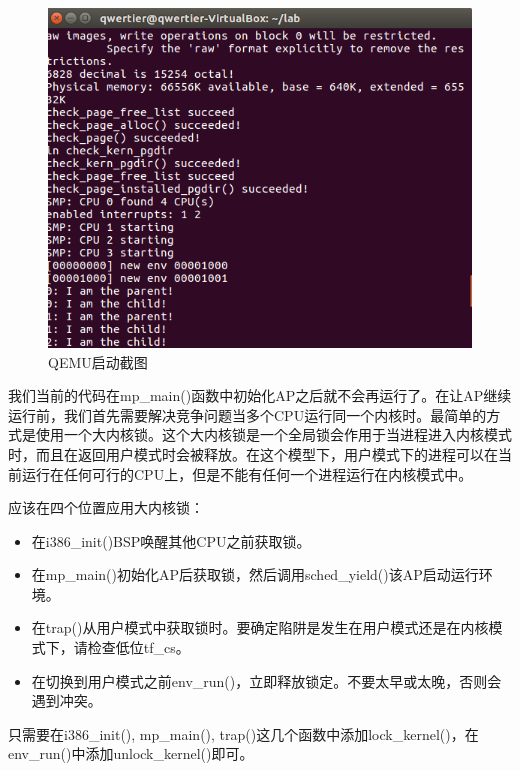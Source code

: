 \begin{ExerciseList}
\begin{figure}[H]
  \centering
  \includegraphics[width=6in]{figures/lab4/mcpu.png}
  \caption{QEMU启动截图}\label{fig:lab4:mcpu}
\end{figure}

我们当前的代码在mp\_main()函数中初始化AP之后就不会再运行了。在让AP继续运行前，我们首先需要解决竞争问题当多个CPU运行同一个内核时。最简单的方式是使用一个大内核锁。这个大内核锁是一个全局锁会作用于当进程进入内核模式时，而且在返回用户模式时会被释放。在这个模型下，用户模式下的进程可以在当前运行在任何可行的CPU上，但是不能有任何一个进程运行在内核模式中。

应该在四个位置应用大内核锁：

\begin{itemize}
\item 在i386\_init()BSP唤醒其他CPU之前获取锁。
\item 在mp\_main()初始化AP后获取锁，然后调用sched\_yield()该AP启动运行环境。
\item 在trap()从用户模式中获取锁时。要确定陷阱是发生在用户模式还是在内核模式下，请检查低位tf\_cs。
\item 在切换到用户模式之前env\_run()，立即释放锁定。不要太早或太晚，否则会遇到冲突。
\end{itemize}


只需要在i386\_init(), mp\_main(), trap()这几个函数中添加lock\_kernel()，在env\_run()中添加unlock\_kernel()即可。


\end{ExerciseList}
